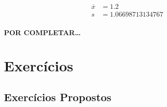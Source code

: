 \documentclass[11pt,a4paper]{article}
\begin{document}
\begin{align*}
	\overline{x} &= 1.2\\
	s &= 1.06698713134767
\end{align*}


\paragraph{POR COMPLETAR\ldots}

\clearpage
\section{Exercícios}
\subsection*{Exercícios Propostos}
\end{document}
